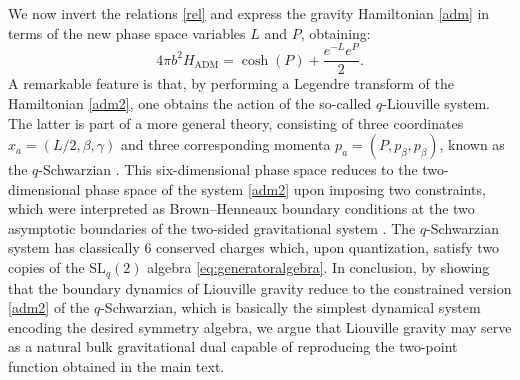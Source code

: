 \documentclass[a4paper,titlepage,12pt]{article}
\numberwithin{equation}{section}
\begin{document}
We now invert the relations \eqref{rel} and express the gravity Hamiltonian \eqref{adm} in terms of the new phase space variables $L$ and $P$, obtaining:
\begin{equation}
\label{adm2}
4\pi b^2 H_{\mathrm{ADM}}= \cosh (P)+\frac{e^{-L}e^{P}}{2}.
\end{equation}
A remarkable feature is that, by performing a Legendre transform of the Hamiltonian \eqref{adm2}, one obtains the action of the so-called $q$-Liouville system. The latter is part of a more general theory, consisting of three coordinates $x_{a}=\left(L/2,\beta,\gamma\right)$ and three corresponding momenta $p_{a}=\left(P,p_{\beta},p_{\beta}\right)$, known as the $q$-Schwarzian \cite{Blommaert:2023wad,Blommaert:2023opb}. This six-dimensional phase space reduces to the two-dimensional phase space of the system \eqref{adm2} upon imposing two constraints, which were interpreted as Brown–Henneaux boundary conditions at the two asymptotic boundaries of the two-sided gravitational system \cite{Blommaert:2023wad,Blommaert:2023opb}. The $q$-Schwarzian system has classically 6 conserved charges which, upon quantization, satisfy two copies of the SL$_q(2)$ algebra \eqref{eq:generatoralgebra}. 
In conclusion, by showing that the boundary dynamics of Liouville gravity reduce to the constrained version \eqref{adm2} of the $q$-Schwarzian, which is basically the simplest dynamical system encoding the desired symmetry algebra, we argue that Liouville gravity may serve as a natural bulk gravitational dual capable of reproducing the two-point function obtained in the main text.
\end{document}
